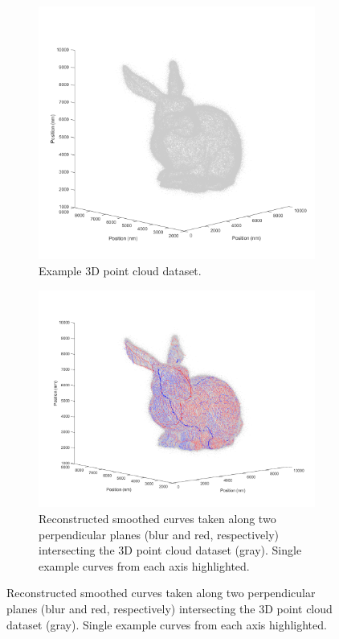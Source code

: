 \documentclass[10pt,a4paper]{article}
\begin{document}
\begin{figure}
	\centering
	\begin{subfigure}[b]{.45\textwidth}
		\centering
		\includegraphics[width=\textwidth]{./figures/bunnyCloud.png}
		\caption[Step1]{Example 3D point cloud dataset.}
		\label{fig:bunnyCloud}
	\end{subfigure}
	\begin{subfigure}[b]{.45\textwidth}
		\centering
		\includegraphics[width=\textwidth]{./figures/bunnyMeridians.png}
		\caption[Step2]{Reconstructed smoothed curves taken along two perpendicular planes (blur and red, respectively) intersecting the 3D point cloud dataset (gray). Single example curves from each axis highlighted.}

\end{subfigure}
\end{figure}
\end{document}
